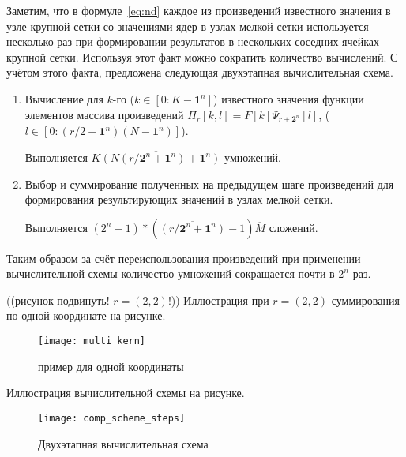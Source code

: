   

Заметим, 
что в формуле~\eqref{eq:nd} каждое из произведений известного значения в узле крупной сетки
со значениями ядер в узлах мелкой сетки используется несколько раз
при формировании результатов в нескольких соседних
ячейках 
крупной сетки.
Используя этот факт можно сократить количество вычислений.
С учётом этого факта,
предложена следующая двухэтапная вычислительная схема.
\begin{enumerate}
\item
  Вычисление для $k$-го ($k \in [0:K-\mathbf{1}^n]$)
  известного значения функции 
  элементов массива произведений
  $\Pi_r[k,l] = F[k]\Psi_{r+\mathbf{2}^n}[l]$,
($l \in [0:(r/2+\mathbf{1}^n)(N-\mathbf{1}^n)]$).

  Выполняется $\overline{K (N(r/\mathbf{2}^n + \mathbf{1}^n) +\mathbf{1}^n)}$ умножений.

\item
  Выбор и суммирование полученных на предыдущем шаге произведений
  для формирования результирующих значений в узлах мелкой сетки.
  

  Выполняется $(2^n-1) * (\overline{(r/\mathbf{2}^n+\mathbf{1}^n)} -1)  \overline{M}$ сложений.

\end{enumerate}

Таким образом за счёт переиспользования произведений при применении вычислительной схемы
количество умножений сокращается почти в  $2^n$ раз.


((рисунок подвинуть! $r=(2,2)$!))
Иллюстрация при $r=(2,2)$ суммирования по одной координате на рисунке.
\begin{figure}[h!]
  \centering
  \texttt{[image: multi\_kern]} 
  \caption{пример для одной координаты}
  \label{fig:reg_net}
\end{figure}
\FloatBarrier


Иллюстрация вычислительной схемы на рисунке.
\begin{figure}[h!]
  \centering
  \texttt{[image: comp\_scheme\_steps]} 
  \caption{Двухэтапная вычислительная схема}
  \label{fig:reg_net}
\end{figure}
\FloatBarrier


